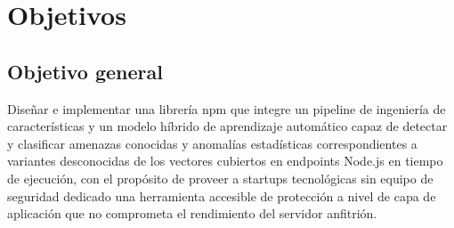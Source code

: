 %
%
\ifdefined\modoensamble
\else
	
\fi

\chapter{Objetivos}

\section{Objetivo general}
Diseñar e implementar una librería npm que integre un pipeline de ingeniería de características y
un modelo híbrido de aprendizaje automático capaz de detectar y clasificar amenazas conocidas y
anomalías estadísticas correspondientes a variantes desconocidas de los vectores cubiertos en
endpoints Node.js en tiempo de ejecución, con el propósito de proveer a startups tecnológicas sin
equipo de seguridad dedicado una herramienta accesible de protección a nivel de capa de
aplicación que no comprometa el rendimiento del servidor anfitrión.

